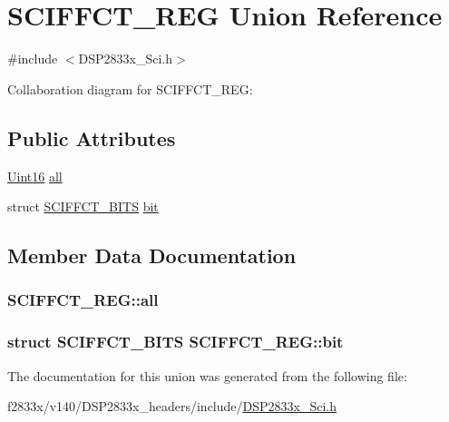 \hypertarget{union_s_c_i_f_f_c_t___r_e_g}{}\section{S\+C\+I\+F\+F\+C\+T\+\_\+\+R\+E\+G Union Reference}
\label{union_s_c_i_f_f_c_t___r_e_g}


{\ttfamily \#include $<$D\+S\+P2833x\+\_\+\+Sci.\+h$>$}



Collaboration diagram for S\+C\+I\+F\+F\+C\+T\+\_\+\+R\+E\+G\+:
\subsection*{Public Attributes}
\begin{DoxyCompactItemize}
\item 
\hyperlink{_d_s_p2833x___device_8h_a59a9f6be4562c327cbfb4f7e8e18f08b}{Uint16} \hyperlink{union_s_c_i_f_f_c_t___r_e_g_a360f6ab6bc205c99e2d97eefc2c191cc}{all}
\item 
struct \hyperlink{struct_s_c_i_f_f_c_t___b_i_t_s}{S\+C\+I\+F\+F\+C\+T\+\_\+\+B\+I\+T\+S} \hyperlink{union_s_c_i_f_f_c_t___r_e_g_a5d6019f4fd4b79743fc70bd67f938d58}{bit}
\end{DoxyCompactItemize}


\subsection{Member Data Documentation}
\hypertarget{union_s_c_i_f_f_c_t___r_e_g_a360f6ab6bc205c99e2d97eefc2c191cc}{}
\subsubsection[{all}]{ S\+C\+I\+F\+F\+C\+T\+\_\+\+R\+E\+G\+::all}\label{union_s_c_i_f_f_c_t___r_e_g_a360f6ab6bc205c99e2d97eefc2c191cc}
\hypertarget{union_s_c_i_f_f_c_t___r_e_g_a5d6019f4fd4b79743fc70bd67f938d58}{}
\subsubsection[{bit}]{\setlength{\rightskip}{0pt plus 5cm}struct {\bf S\+C\+I\+F\+F\+C\+T\+\_\+\+B\+I\+T\+S} S\+C\+I\+F\+F\+C\+T\+\_\+\+R\+E\+G\+::bit}\label{union_s_c_i_f_f_c_t___r_e_g_a5d6019f4fd4b79743fc70bd67f938d58}


The documentation for this union was generated from the following file\+:\begin{DoxyCompactItemize}
\item 
f2833x/v140/\+D\+S\+P2833x\+\_\+headers/include/\hyperlink{_d_s_p2833x___sci_8h}{D\+S\+P2833x\+\_\+\+Sci.\+h}\end{DoxyCompactItemize}

